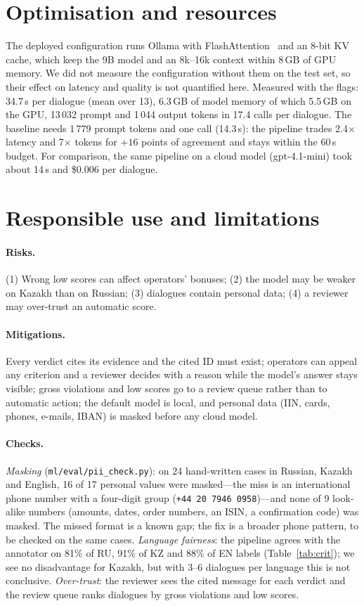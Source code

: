 \documentclass[11pt,a4paper]{article}
\begin{document}
\section{Optimisation and resources}
The deployed configuration runs Ollama with FlashAttention~\cite{dao2022flashattention} and an 8-bit KV
cache, which keep the 9B model and an 8k--16k context within 8\,GB of GPU memory. We did not measure the
configuration without them on the test set, so their effect on latency and quality is not quantified here.
Measured with the flags: 34.7\,s per dialogue (mean
over 13), 6.3\,GB of model memory of which 5.5\,GB on the GPU, 13\,032 prompt and 1\,044 output tokens in 17.4
calls per dialogue. The baseline needs 1\,779 prompt tokens and one call (14.3\,s): the pipeline trades
2.4$\times$ latency and 7$\times$ tokens for $+16$ points of agreement and stays within the 60\,s budget.
For comparison, the same pipeline on a cloud model (gpt-4.1-mini) took about 14\,s and \$0.006 per dialogue.

\section{Responsible use and limitations}\label{sec:responsible}
\paragraph{Risks.} (1) Wrong low scores can affect operators' bonuses; (2) the model may be weaker on Kazakh
than on Russian; (3) dialogues contain personal data; (4) a reviewer may over-trust an automatic score.
\paragraph{Mitigations.} Every verdict cites its evidence and the cited ID must exist; operators can appeal any
criterion and a reviewer decides with a reason while the model's answer stays visible; gross violations and low
scores go to a review queue rather than to automatic action; the default model is local, and personal data
(IIN, cards, phones, e-mails, IBAN) is masked before any cloud model.
\paragraph{Checks.} \emph{Masking} (\texttt{ml/eval/pii\_check.py}): on 24 hand-written cases in Russian,
Kazakh and English, 16 of 17 personal values were masked---the miss is an international phone number with a
four-digit group (\texttt{+44 20 7946 0958})---and none of 9 look-alike numbers (amounts, dates, order numbers,
an ISIN, a confirmation code) was masked. The missed format is a known gap; the fix is a broader phone
pattern, to be checked on the same cases. \emph{Language fairness}: the pipeline agrees with the annotator on
81\% of RU, 91\% of KZ and 88\% of EN labels (Table~\ref{tab:crit}); we see no disadvantage for Kazakh, but with
3--6 dialogues per language this is not conclusive. \emph{Over-trust}: the reviewer sees the cited message for
each verdict and the review queue ranks dialogues by gross violations and low scores.
\end{document}
